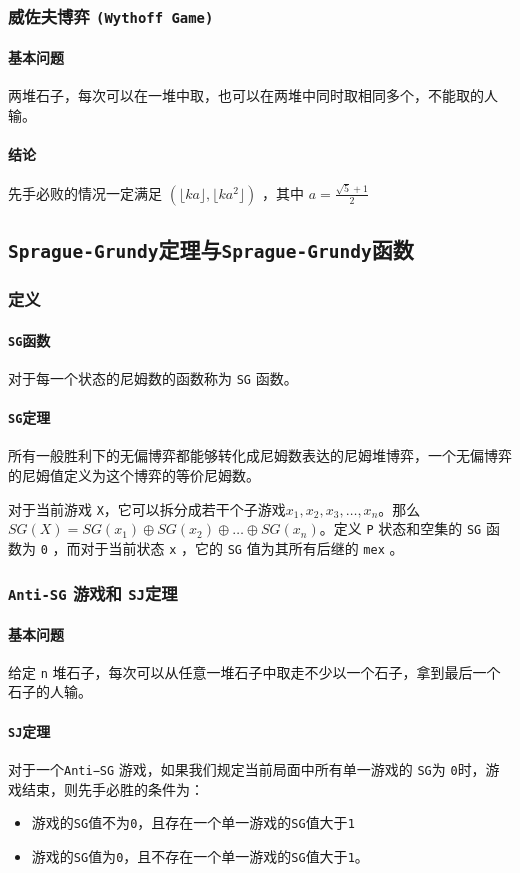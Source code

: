 \documentclass[UTF-8]{ctexart}
\begin{document}
	\subsubsection{威佐夫博弈 \texttt{(Wythoff Game)}}
	\paragraph{基本问题} 两堆石子，每次可以在一堆中取，也可以在两堆中同时取相同多个，不能取的人输。
	\paragraph{结论} 先手必败的情况一定满足 $(\lfloor ka\rfloor,\lfloor ka^2 \rfloor )$ ，其中 $a=\frac{\sqrt{5}+1}{2}$
	
	\subsection{\texttt{Sprague-Grundy}定理与\texttt{Sprague-Grundy}函数}
	\subsubsection{定义}
	\paragraph{\texttt{SG}函数} 对于每一个状态的尼姆数的函数称为 \texttt{SG} 函数。
	\paragraph{\texttt{SG}定理} 所有一般胜利下的无偏博弈都能够转化成尼姆数表达的尼姆堆博弈，一个无偏博弈的尼姆值定义为这个博弈的等价尼姆数。
	
	对于当前游戏 \texttt{X}，它可以拆分成若干个子游戏$x_1,x_2,x_3,\dots,x_n$。那么$SG(X)=SG(x_1)\oplus SG(x_2)\oplus\dots\oplus SG(x_n)$。定义 \texttt{P} 状态和空集的 \texttt{SG} 函数为 \texttt{0} ，而对于当前状态 \texttt{x} ，它的 \texttt{SG} 值为其所有后继的 \texttt{mex} 。
	
	\subsubsection{\texttt{Anti-SG} 游戏和 \texttt{SJ}定理}
	\paragraph{基本问题}给定 \texttt{n} 堆石子，每次可以从任意一堆石子中取走不少以一个石子，拿到最后一个石子的人输。
	\paragraph{\texttt{SJ}定理} 对于一个\texttt{Anti−SG} 游戏，如果我们规定当前局面中所有单一游戏的 \texttt{SG}为 \texttt{0}时，游戏结束，则先手必胜的条件为：
	\begin{itemize}
		\item 游戏的\texttt{SG}值不为\texttt{0}，且存在一个单一游戏的\texttt{SG}值大于\texttt{1}
		\item 游戏的\texttt{SG}值为\texttt{0}，且不存在一个单一游戏的\texttt{SG}值大于\texttt{1}。
	\end{itemize}
	
\end{document}
